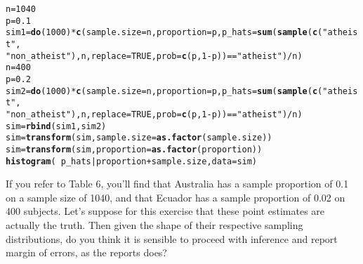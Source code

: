 \documentclass{article}\usepackage[]{graphicx}\usepackage[]{color}
\makeatletter
\newcommand{\hlnum}[1]{\textcolor[rgb]{0.686,0.059,0.569}{#1}}%
\newcommand{\hlstr}[1]{\textcolor[rgb]{0.192,0.494,0.8}{#1}}%
\newcommand{\hlopt}[1]{\textcolor[rgb]{0,0,0}{#1}}%
\newcommand{\hlstd}[1]{\textcolor[rgb]{0.345,0.345,0.345}{#1}}%
\newcommand{\hlkwb}[1]{\textcolor[rgb]{0.69,0.353,0.396}{#1}}%
\newcommand{\hlkwc}[1]{\textcolor[rgb]{0.333,0.667,0.333}{#1}}%
\newcommand{\hlkwd}[1]{\textcolor[rgb]{0.737,0.353,0.396}{\textbf{#1}}}%
\newenvironment{kframe}{%
 \def\at@end@of@kframe{}%
 \ifinner\ifhmode%
  \def\at@end@of@kframe{\end{minipage}}%
  \begin{minipage}{\columnwidth}%
 \fi\fi%
 \def\FrameCommand##1{\hskip\@totalleftmargin \hskip-\fboxsep
 \colorbox{shadecolor}{##1}\hskip-\fboxsep
     \hskip-\linewidth \hskip-\@totalleftmargin \hskip\columnwidth}%
 \MakeFramed {\advance\hsize-\width
   \@totalleftmargin\z@ \linewidth\hsize
   \@setminipage}}%
 {\par\unskip\endMakeFramed%
 \at@end@of@kframe}
\newenvironment{knitrout}{}{} %
\makeatother
\begin{document}
\begin{knitrout}
\color{fgcolor}\begin{kframe}
\begin{alltt}
\hlstd{n} \hlkwb{=} \hlnum{1040}
\hlstd{p} \hlkwb{=} \hlnum{0.1}
\hlstd{sim1} \hlkwb{=} \hlkwd{do}\hlstd{(}\hlnum{1000}\hlstd{)} \hlopt{*} \hlkwd{c}\hlstd{(}\hlkwc{sample.size} \hlstd{= n,} \hlkwc{proportion} \hlstd{= p,} \hlkwc{p_hats} \hlstd{=} \hlkwd{sum}\hlstd{(}\hlkwd{sample}\hlstd{(}\hlkwd{c}\hlstd{(}\hlstr{"atheist"}\hlstd{,}
    \hlstr{"non_atheist"}\hlstd{), n,} \hlkwc{replace} \hlstd{=} \hlnum{TRUE}\hlstd{,} \hlkwc{prob} \hlstd{=} \hlkwd{c}\hlstd{(p,} \hlnum{1} \hlopt{-} \hlstd{p))} \hlopt{==} \hlstr{"atheist"}\hlstd{)}\hlopt{/}\hlstd{n)}
\hlstd{n} \hlkwb{=} \hlnum{400}
\hlstd{p} \hlkwb{=} \hlnum{0.2}
\hlstd{sim2} \hlkwb{=} \hlkwd{do}\hlstd{(}\hlnum{1000}\hlstd{)} \hlopt{*} \hlkwd{c}\hlstd{(}\hlkwc{sample.size} \hlstd{= n,} \hlkwc{proportion} \hlstd{= p,} \hlkwc{p_hats} \hlstd{=} \hlkwd{sum}\hlstd{(}\hlkwd{sample}\hlstd{(}\hlkwd{c}\hlstd{(}\hlstr{"atheist"}\hlstd{,}
    \hlstr{"non_atheist"}\hlstd{), n,} \hlkwc{replace} \hlstd{=} \hlnum{TRUE}\hlstd{,} \hlkwc{prob} \hlstd{=} \hlkwd{c}\hlstd{(p,} \hlnum{1} \hlopt{-} \hlstd{p))} \hlopt{==} \hlstr{"atheist"}\hlstd{)}\hlopt{/}\hlstd{n)}
\hlstd{sim} \hlkwb{=} \hlkwd{rbind}\hlstd{(sim1, sim2)}
\hlstd{sim} \hlkwb{=} \hlkwd{transform}\hlstd{(sim,} \hlkwc{sample.size} \hlstd{=} \hlkwd{as.factor}\hlstd{(sample.size))}
\hlstd{sim} \hlkwb{=} \hlkwd{transform}\hlstd{(sim,} \hlkwc{proportion} \hlstd{=} \hlkwd{as.factor}\hlstd{(proportion))}
\hlkwd{histogram}\hlstd{(}\hlopt{~}\hlstd{p_hats} \hlopt{|} \hlstd{proportion} \hlopt{+} \hlstd{sample.size,} \hlkwc{data} \hlstd{= sim)}
\end{alltt}
\end{kframe}
\end{knitrout}



\begin{exercise}
If you refer to Table 6,  you'll find that Australia has a sample proportion of 0.1 on a sample size of 1040, and that Ecuador has a sample proportion of 0.02 on 400 subjects. Let's suppose for this exercise that these point estimates are actually the truth. Then given the shape of their respective sampling distributions, do you think it is sensible to proceed with inference and report margin of errors, as the reports does?
\end{exercise}
\end{document}

